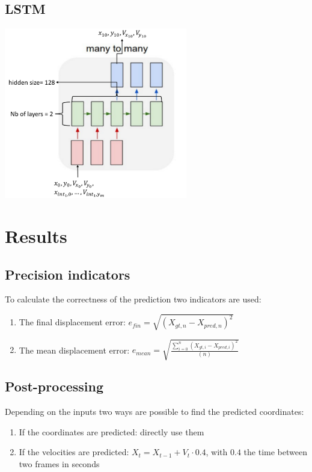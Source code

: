 \documentclass[a0,portrait]{a0poster}
\begin{document}
\begin{multicols}{2}
\begin{minipage}[]{0.5\linewidth}
\subsection*{LSTM}

\centerline {\includegraphics[width=0.6\textwidth]{figure/manytomany}}
\end{minipage}


\section*{Results}
\subsection*{Precision indicators}
To calculate the correctness of the prediction two indicators are used:
\begin{enumerate}
\justifying
\item The final displacement error: $e_{fin} = \sqrt{(X_{gt,n}-X_{pred,n})^2}$
\item The mean displacement error: $e_{mean} = \sqrt{\frac{\sum_{i=0}^n(X_{gt,i}-X_{pred,i})^2}{(n)}}$
\end{enumerate}
\vspace{0.5cm}

\subsection*{Post-processing}
Depending on the inputs two ways are possible to find the predicted coordinates:
\begin{enumerate}
\justifying
\item If the coordinates are predicted: directly use them
\item If the velocities are predicted: $X_{t} = X_{t-1} + V_{t}\cdot 0.4$, with $0.4$ the time between two frames in seconds
\end{enumerate}


\end{multicols}
\end{document}
